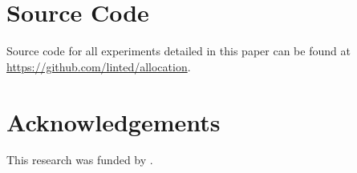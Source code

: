 \documentclass[letterpaper, 10 pt, conference]{ieeeconf}  %
\newcommand*\GitHubLoc{https://github.com/linted/allocation}
\begin{document}

\section{Source Code}

Source code for all experiments detailed in this paper can be found at \url{\GitHubLoc}.



% 
% 

\section{Acknowledgements}

\noindent This research was funded by .

\clearpage
\end{document}
